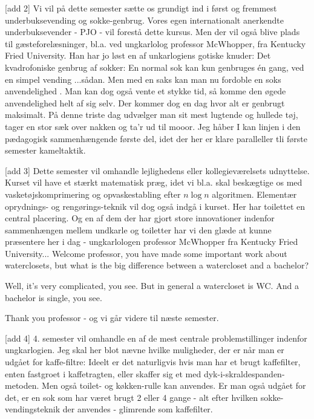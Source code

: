\documentclass[a4paper,11pt]{article}
\begin{document}
\begin{sketch}
  [add 2] Vi vil på dette semester sætte os grundigt ind i
  først og fremmest underbuksevending og sokke-genbrug.  Vores egen
  internationalt anerkendte underbuksevender - PJO - vil forestå dette
  kursus.  Men der vil også blive plads til gæsteforelæsninger,
  bl.a. ved ungkarlolog professor McWhopper, fra Kentucky Fried
  University.  Han har jo løst en af unkarlogiens gotiske knuder: Det
  kvadrofoniske genbrug af sokker: En normal sok kan kun genbruges én
  gang, ved en simpel vending  ...sådan.  Men med en saks
  kan man nu fordoble en soks anvendelighed .  Man kan dog
  også vente et stykke tid, så komme den øgede anvendelighed helt af
  sig selv.  Der kommer dog en dag hvor alt er genbrugt maksimalt.  På
  denne triste dag udvælger man sit mest lugtende og hullede tøj,
  tager en stor sæk over nakken og ta'r ud til mooor.  Jeg håber I kan
  linjen i den pædagogisk sammenhængende første del, idet der her er
  klare paralleller tli første semester kameltaktik.

  [add 3] Dette semester vil omhandle lejlighedens eller
  kollegieværelsets udnyttelse.  Kurset vil have et stærkt matematisk
  præg, idet vi bl.a. skal beskægtige os med vasketøjskomprimering og
  opvaskestabling efter $n\log n$ algoritmen.  Elementær oprydnings-
  og rengørings-teknik vil dog også indgå i kurset.  Her har toilettet
  en central placering.  Og en af dem der har gjort store innovationer
  indenfor sammenhængen mellem undkarle og toiletter har vi den glæde
  at kunne præsentere her i dag - ungkarlologen professor McWhopper
  fra Kentucky Fried University... 
  Welcome professor, you have made some important work about
  waterclosets, but what is the big difference between a watercloset
  and a bachelor?

   Well, it's very complicated, you see.  But in general a
  watercloset is WC.  And a bachelor is single, you see.

   Thank you professor  - og vi går videre til
  næste semester.

  [add 4] 4. semester vil omhandle en af de mest centrale
  problemstillinger indenfor ungkarlogien.  Jeg skal her blot nævne
  hvilke muligheder, der er når man er udgået for kaffe-filtre: Ideelt
  er det naturligvis hvis man har et brugt kaffefilter, enten
  fastgroet i kaffetragten, eller skaffer sig et med
  dyk-i-skraldespanden-metoden.  Men også toilet- og køkken-rulle kan
  anvendes.  Er man også udgået for det, er en sok som har været brugt
  2 eller 4 gange - alt efter hvilken sokke-vendingsteknik der
  anvendes - glimrende som kaffefilter.



\end{sketch}
\end{document}
